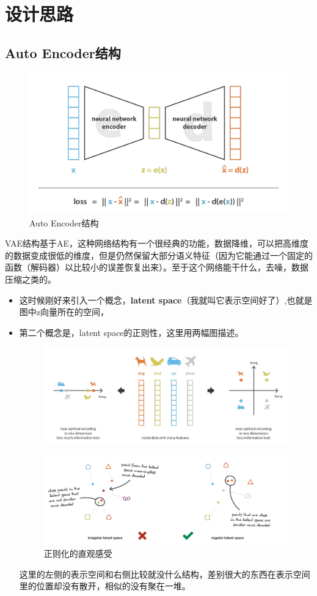 \documentclass[]{report}
\begin{document}
\section{设计思路}
\subsection{Auto Encoder结构}
\begin{figure}[h]
	\centering
	\includegraphics[width=0.7\linewidth]{images/screenshot006}
	\caption{Auto Encoder结构}
	\label{fig:screenshot006}
\end{figure}
\indent VAE结构基于AE，这种网络结构有一个很经典的功能，数据降维，可以把高维度的数据变成很低的维度，但是仍然保留大部分语义特征（因为它能通过一个固定的函数（解码器）以比较小的误差恢复出来）。至于这个网络能干什么，去噪，数据压缩之类的。
\begin{itemize}
	\item 这时候刚好来引入一个概念，\textbf{latent space}（我就叫它表示空间好了）,也就是图中z向量所在的空间，
	\item 第二个概念是，latent space的正则性，这里用两幅图描述。
	\begin{figure}[t]
		\centering
		\includegraphics[width=1\linewidth]{images/screenshot007}
		\label{fig:screenshot007}
	\end{figure}
	\begin{figure}[h]
		\centering
		\includegraphics[width=1\linewidth]{images/screenshot008}
		\caption{正则化的直观感受}
		\label{fig:screenshot008}
	\end{figure}
	
	\FloatBarrier
	这里的左侧的表示空间和右侧比较就没什么结构，差别很大的东西在表示空间里的位置却没有散开，相似的没有聚在一堆。
\end{itemize}
\end{document}
